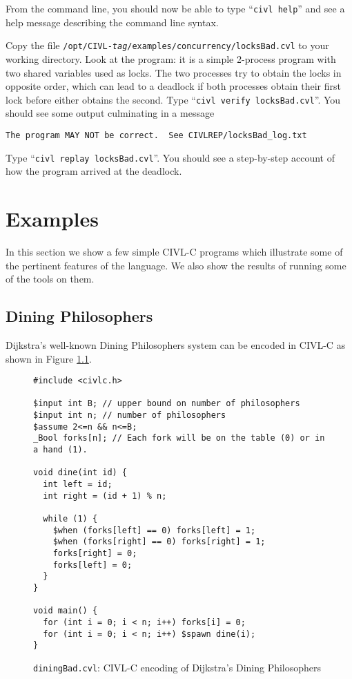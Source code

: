 From the command line, you should now be able to type ``\texttt{civl
  help}'' and see a help message describing the command line syntax.

Copy the file
\texttt{/opt/CIVL-\textit{tag}/examples/concurrency/locksBad.cvl} to
your working directory.  Look at the program: it is a simple 2-process
program with two shared variables used as locks.  The two processes
try to obtain the locks in opposite order, which can lead to a
deadlock if both processes obtain their first lock before either
obtains the second.  Type ``\verb!civl verify locksBad.cvl!''.  You
should see some output culminating in a message
\begin{verbatim}
The program MAY NOT be correct.  See CIVLREP/locksBad_log.txt
\end{verbatim}

Type ``\verb!civl replay locksBad.cvl!''.  You should see a
step-by-step account of how the program arrived at the deadlock.


\chapter{Examples}

In this section we show a few simple CIVL-C programs which illustrate
some of the pertinent features of the language. We also show the results
of running some of the tools on them.

\section{Dining Philosophers}

Dijkstra's well-known Dining Philosophers system can be encoded in
CIVL-C as shown in Figure \ref{fig:dining}.

\begin{figure}[t]
  \begin{small}
\begin{verbatim}
#include <civlc.h>

$input int B; // upper bound on number of philosophers
$input int n; // number of philosophers
$assume 2<=n && n<=B;
_Bool forks[n]; // Each fork will be on the table (0) or in a hand (1). 

void dine(int id) {
  int left = id;
  int right = (id + 1) % n;

  while (1) {
    $when (forks[left] == 0) forks[left] = 1;
    $when (forks[right] == 0) forks[right] = 1;
    forks[right] = 0;
    forks[left] = 0;
  }
}

void main() {
  for (int i = 0; i < n; i++) forks[i] = 0;
  for (int i = 0; i < n; i++) $spawn dine(i);
}
\end{verbatim}
  \end{small}
  \caption{\texttt{diningBad.cvl}: CIVL-C encoding of Dijkstra's Dining Philosophers}
  \label{fig:dining}
\end{figure}

